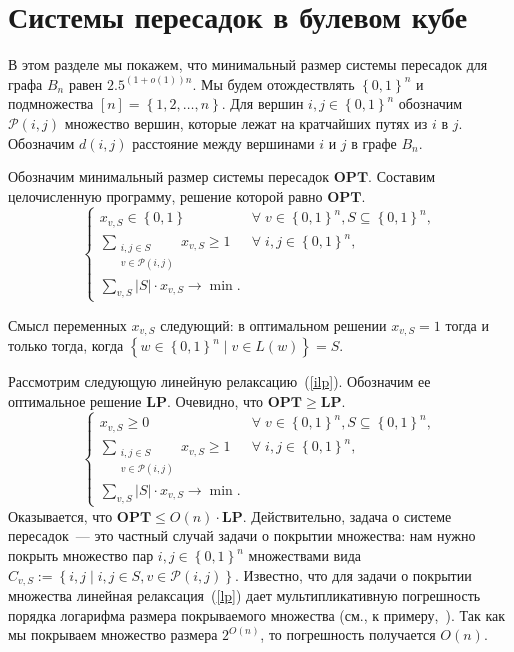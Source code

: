 \documentclass[12pt]{article}
\newcommand{\set}[1]{\left\{#1\right\}}
\newcommand{\abs}[1]{\left|#1\right|}
\newcommand{\zo}{\set{0, 1}}
\newcommand{\Pc}{\mathcal{P}}
\newcommand{\setst}[2]{\set{#1 \mid #2}}
\begin{document}
    \section{Системы пересадок в булевом кубе}
    \label{section_hub_labels}
    В этом разделе мы покажем, что минимальный размер системы пересадок для графа $B_n$ равен $2.5^{(1+o(1))n}$.
    Мы будем отождествлять $\zo^n$ и подмножества $[n] = \set{1, 2, \ldots, n}$.
    Для вершин $i, j \in \zo^n$ обозначим $\Pc(i, j)$ множество вершин, которые лежат
    на кратчайших путях из $i$ в $j$. Обозначим $d(i, j)$ расстояние между вершинами $i$ и $j$ в графе $B_n$.

    Обозначим минимальный размер
    системы пересадок $\mathbf{OPT}$.
    Составим целочисленную программу, решение которой равно $\mathbf{OPT}$.
    \begin{equation}
        \label{ilp}
        \begin{cases}
            x_{v,S} \in \zo & \forall \; v \in \zo^n, S \subseteq \zo^n, \\ 
            \sum_{\begin{smallmatrix}i, j \in S \\ v \in \Pc(i, j)\end{smallmatrix}} x_{v,S} \geq 1 & \forall \; i, j \in \zo^n, \\
            \sum_{v,S} |S| \cdot x_{v,S} \to \min.
        \end{cases}
    \end{equation}

    Смысл переменных $x_{v,S}$ следующий: в оптимальном решении $x_{v,S} = 1$ тогда и только тогда, когда $\setst{w \in \zo^n}{v \in L(w)} = S$.

    Рассмотрим следующую линейную релаксацию~(\ref{ilp}). Обозначим ее оптимальное решение $\mathbf{LP}$.
    Очевидно, что $\mathbf{OPT} \geq \mathbf{LP}$. 
    \begin{equation}
        \label{lp}
        \begin{cases}
            x_{v,S} \geq 0 & \forall \; v \in \zo^n, S \subseteq \zo^n, \\ 
            \sum_{\begin{smallmatrix}i, j \in S \\ v \in \Pc(i, j)\end{smallmatrix}} x_{v,S} \geq 1 & \forall \; i, j \in \zo^n, \\
            \sum_{v,S} \abs{S} \cdot x_{v,S} \to \min.
        \end{cases}
    \end{equation}
    Оказывается, что $\mathbf{OPT} \leq O(n) \cdot \mathbf{LP}$. Действительно, задача о системе пересадок~--- это частный случай
    задачи о покрытии множества: нам нужно покрыть множество пар $i, j \in \zo^n$ множествами вида
    $C_{v,S} := \setst{i, j}{i, j \in S, v \in \Pc(i, j)}$.
    Известно, что для задачи о покрытии множества линейная релаксация~(\ref{lp}) дает мультипликативную
    погрешность порядка логарифма размера покрываемого
    множества (см., к примеру,~\cite{V04}).
    Так как мы покрываем множество размера $2^{O(n)}$, то погрешность получается $O(n)$.
\end{document}
